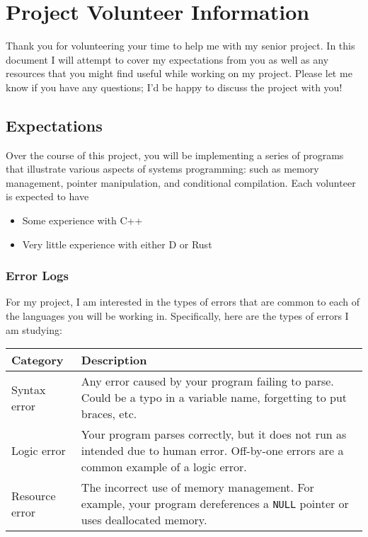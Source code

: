 \section{Project Volunteer
Information}\label{project-volunteer-information}

Thank you for volunteering your time to help me with my senior project.
In this document I will attempt to cover my expectations from you as
well as any resources that you might find useful while working on my
project. Please let me know if you have any questions; I'd be happy to
discuss the project with you!

\subsection{Expectations}\label{expectations}

Over the course of this project, you will be implementing a series of
programs that illustrate various aspects of systems programming: such as
memory management, pointer manipulation, and conditional compilation.
Each volunteer is expected to have

\begin{itemize}
\itemsep1pt\parskip0pt
\item
  Some experience with C++
\item
  Very little experience with either D or Rust
\end{itemize}

\subsubsection{Error Logs}\label{error-logs}

For my project, I am interested in the types of errors that are common
to each of the languages you will be working in. Specifically, here are
the types of errors I am studying:

\begin{longtable}[c]{@{}ll@{}}
\toprule
Category & Description\tabularnewline
\midrule
\endhead
Syntax error & Any error caused by your program failing to parse. Could
be a typo in a variable name, forgetting to put braces,
etc.\tabularnewline
Logic error & Your program parses correctly, but it does not run as
intended due to human error. Off-by-one errors are a common example of a
logic error.\tabularnewline
Resource error & The incorrect use of memory management. For example,
your program dereferences a \lstinline!NULL! pointer or uses deallocated
memory.\tabularnewline
\bottomrule
\end{longtable}

